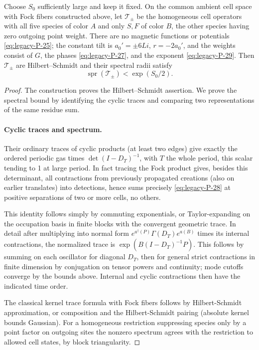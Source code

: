 \begin{lemma}\label{lem:u-homogeneous-operator}
Choose $S_0$ sufficiently large and keep it fixed.  On the common
ambient cell space with Fock fibers constructed above, let
$\mathcal T_\pm$ be the homogeneous cell operators with all five species
of color $A$ and only $S,F$ of color $B$, the other species having zero
outgoing point weight.  There are no magnetic functions or potentials
\eqref{eq:legacy-P-25}; the constant tilt is $a_0'=\pm6Li$, $r=-2a_0'$,
and the weights consist of $G$, the phases \eqref{eq:legacy-P-27}, and
the exponent \eqref{eq:legacy-P-29}.  Then $\mathcal T_\pm$ are
Hilbert--Schmidt and their spectral radii satisfy
\[
 \operatorname{spr}(\mathcal T_\pm)<\exp(S_0/2).
\]
\end{lemma}
\begin{proof}
The construction proves the Hilbert--Schmidt assertion.  We prove the
spectral bound by identifying the cyclic traces and comparing two
representations of the same residue sum.

\paragraph{Cyclic traces and spectrum.}
Their ordinary traces of cyclic products (at least two edges) give exactly the ordered periodic gas times \(\det(I-D_T)^{-1}\), with \(T\) the whole period, this scalar tending to 1 at large period. In fact tracing the Fock product gives, besides this determinant, all contractions from previously propagated creations (also on earlier translates) into detections, hence sums precisely \eqref{eq:legacy-P-28} at positive separations of two or more cells, no others.

This identity follows simply by commuting exponentials, or Taylor-expanding on the occupation basis in finite blocks with the convergent geometric trace. In detail after multiplying into normal form \(e^{a^\dagger(P)}\Gamma(D_T)e^{a(B)}\) times its internal contractions, the normalized trace is \(\exp(B(I-D_T)^{-1}P)\). This follows by summing on each oscillator for diagonal \(D_T\), then for general strict contractions in finite dimension by conjugation on tensor powers and continuity; mode cutoffs converge by the bounds above. Internal and cyclic contractions then have the indicated time order.

The classical kernel trace formula with Fock fibers follows by Hilbert-Schmidt approximation, or composition and the Hilbert-Schmidt pairing (absolute kernel bounds Gaussian). For a homogeneous restriction suppressing species only by a point factor on outgoing sites the nonzero spectrum agrees with the restriction to allowed cell states, by block triangularity.




\end{proof}
